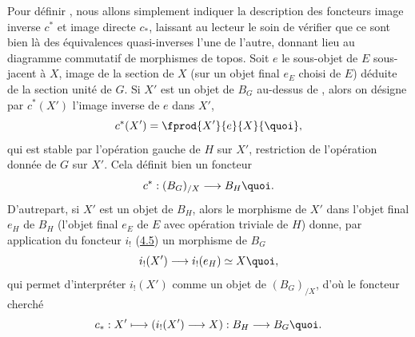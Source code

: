 \documentclass[10pt]{../fichiers-configuration-latex/smfart}
\begin{document}
Pour définir , nous allons simplement indiquer la
description des foncteurs image inverse $c^{\ast}$ et image directe
$c_{\ast}$, laissant au lecteur le soin de vérifier que ce sont
bien là des équivalences quasi-inverses l'une de l'autre,
donnant lieu au diagramme commutatif  de morphismes de
topos. Soit $e$ le sous-objet de $E$ sous-jacent à $X$, image de
la section de $X$ (sur un objet final $e_E$ choisi de $E$) déduite
de la section unité de $G$. Si $X'$ est un objet de $B_G$
au-dessus de , alors on désigne par $c^{\ast}(X')$ l'image
inverse de $e$ dans $X'$,
$$
c^{\ast}(X')=\fprod{X'}{e}{X}{\quoi},
$$
qui est stable par l'opération gauche de $H$ sur $X'$, restriction
de l'opération donnée de $G$ sur $X'$. Cela définit bien un
foncteur
$$
c^{\ast}:(B_G)_{/X}\longrightarrow B_H{\quoi}.
$$
D'autre\pageoriginale part, si $X'$ est un objet de $B_H$, alors le
morphisme de $X'$ dans l'objet final $e_H$ de $B_H$ (\ie l'objet
final $e_E$ de $E$ avec opération triviale de $H$) donne, par
application du foncteur $i_{!}$ (\hyperref[IV.subsec4.5]{4.5}) un morphisme de
$B_G$
$$
i_{!}(X')\longrightarrow i_{!}(e_H)\simeq X{\quoi},
$$
qui permet d'interpréter $i_{!}(X')$ comme un objet de
$(B_G)_{/X}$,  d'où le foncteur cherché
$$
c_{\ast}:X'\longmapsto (i_{!}(X')\longrightarrow
X):B_H\longrightarrow B_G{\quoi}.
$$

\setcounter{subsubsection}{2}
\end{document}
